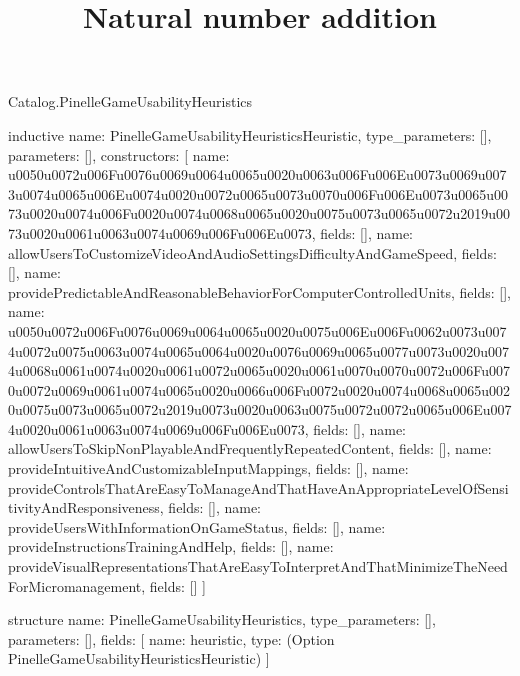 \begin{lexlean}{Catalog.PinelleGameUsabilityHeuristics}
\title{Natural number addition}
\begin{semanticmodule}
inductive{
  name: PinelleGameUsabilityHeuristicsHeuristic,
  type_parameters: [],
  parameters: [],
  constructors: [
    {name: u0050u0072u006Fu0076u0069u0064u0065u0020u0063u006Fu006Eu0073u0069u0073u0074u0065u006Eu0074u0020u0072u0065u0073u0070u006Fu006Eu0073u0065u0073u0020u0074u006Fu0020u0074u0068u0065u0020u0075u0073u0065u0072u2019u0073u0020u0061u0063u0074u0069u006Fu006Eu0073, fields: []},
    {name: allowUsersToCustomizeVideoAndAudioSettingsDifficultyAndGameSpeed, fields: []},
    {name: providePredictableAndReasonableBehaviorForComputerControlledUnits, fields: []},
    {name: u0050u0072u006Fu0076u0069u0064u0065u0020u0075u006Eu006Fu0062u0073u0074u0072u0075u0063u0074u0065u0064u0020u0076u0069u0065u0077u0073u0020u0074u0068u0061u0074u0020u0061u0072u0065u0020u0061u0070u0070u0072u006Fu0070u0072u0069u0061u0074u0065u0020u0066u006Fu0072u0020u0074u0068u0065u0020u0075u0073u0065u0072u2019u0073u0020u0063u0075u0072u0072u0065u006Eu0074u0020u0061u0063u0074u0069u006Fu006Eu0073, fields: []},
    {name: allowUsersToSkipNonPlayableAndFrequentlyRepeatedContent, fields: []},
    {name: provideIntuitiveAndCustomizableInputMappings, fields: []},
    {name: provideControlsThatAreEasyToManageAndThatHaveAnAppropriateLevelOfSensitivityAndResponsiveness, fields: []},
    {name: provideUsersWithInformationOnGameStatus, fields: []},
    {name: provideInstructionsTrainingAndHelp, fields: []},
    {name: provideVisualRepresentationsThatAreEasyToInterpretAndThatMinimizeTheNeedForMicromanagement, fields: []}
  ]
}

structure{
  name: PinelleGameUsabilityHeuristics,
  type_parameters: [],
  parameters: [],
  fields: [
    {name: heuristic, type: (Option PinelleGameUsabilityHeuristicsHeuristic)}
  ]
}
\end{semanticmodule}
\end{lexlean}
